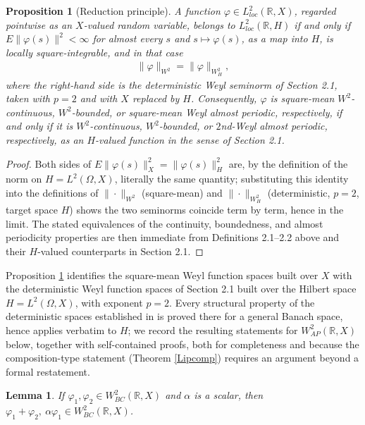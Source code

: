 \documentclass[10pt,a4paper]{amsart}
\newtheorem{lemma}[theorem]{Lemma}
\newtheorem{proposition}[theorem]{Proposition}
\begin{document}
\begin{proposition}[Reduction principle]\label{reduction}
A function $\varphi\in L^2_{loc}(\mathbb R,X)$, regarded pointwise as an $X$-valued random variable, belongs to $L^2_{loc}(\mathbb R,H)$ if and only if $E\|\varphi(s)\|^2<\infty$ for almost every $s$ and $s\mapsto\varphi(s)$, as a map into $H$, is locally square-integrable, and in that case
\begin{align*}
\|\varphi\|_{W^2}=\|\varphi\|_{W^2_H},
\end{align*}
where the right-hand side is the deterministic Weyl seminorm of Section 2.1, taken with $p=2$ and with $X$ replaced by $H$. Consequently, $\varphi$ is square-mean $W^2$-continuous, $W^2$-bounded, or square-mean Weyl almost periodic, respectively, if and only if it is $W^2$-continuous, $W^2$-bounded, or $2$nd-Weyl almost periodic, respectively, as an $H$-valued function in the sense of Section 2.1.
\end{proposition}

\begin{proof}
Both sides of $E\|\varphi(s)\|_X^2=\|\varphi(s)\|_H^2$ are, by the definition of the norm on $H=L^2(\Omega,X)$, literally the same quantity; substituting this identity into the definitions of $\|\cdot\|_{W^2}$ (square-mean) and $\|\cdot\|_{W^2_H}$ (deterministic, $p=2$, target space $H$) shows the two seminorms coincide term by term, hence in the limit. The stated equivalences of the continuity, boundedness, and almost periodicity properties are then immediate from Definitions 2.1--2.2 above and their $H$-valued counterparts in Section 2.1.
\end{proof}

Proposition \ref{reduction} identifies the square-mean Weyl function spaces built over $X$ with the deterministic Weyl function spaces of Section 2.1 built over the Hilbert space $H=L^2(\Omega,X)$, with exponent $p=2$. Every structural property of the deterministic spaces established in \cite[Section 2]{LiWeyl} is proved there for a general Banach space, hence applies verbatim to $H$; we record the resulting statements for $W^2_{AP}(\mathbb R,X)$ below, together with self-contained proofs, both for completeness and because the composition-type statement (Theorem \ref{Lipcomp}) requires an argument beyond a formal restatement.

\begin{lemma}\label{BClinear}
If $\varphi_1,\varphi_2\in W^2_{BC}(\mathbb R,X)$ and $\alpha$ is a scalar, then $\varphi_1+\varphi_2,\ \alpha\varphi_1\in W^2_{BC}(\mathbb R,X)$.
\end{lemma}
\end{document}
